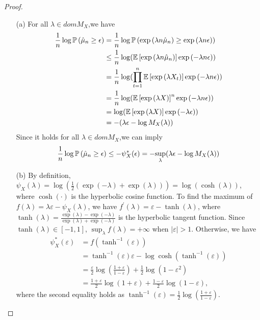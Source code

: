 \begin{proof}
\begin{enumerate}
	\item[(a)] For all $\lambda\in domM_X$,we have 
	    \begin{align*}
	        \frac{1}{n}\log\mathbb{P} \left(\hat{\mu}_n\geq\epsilon\right)&=\frac{1}{n}\log\mathbb{P} \left(\exp{(\lambda n\hat{\mu}_n)}\geq\exp{(\lambda n \epsilon)}\right)\\
	        &\leq \frac{1}{n}\log(\mathbb{E} \left[\exp{(\lambda n\hat{\mu}_n)}\right]\exp{(-\lambda n \epsilon)})\\
	        &=\frac{1}{n}\log(\prod_{t=1}^n\mathbb{E} \left[\exp{(\lambda X_t)}\right]\exp{(-\lambda n \epsilon)})\\
	        &=\frac{1}{n}\log(\mathbb{E} \left[\exp{(\lambda X)}\right]^n\exp{(-\lambda n \epsilon)})\\
	        &=\log(\mathbb{E} \left[\exp{(\lambda X)}\right]\exp{(-\lambda\epsilon)})\\
	        &=-(\lambda\epsilon-\log M_X(\lambda))
	    \end{align*}
        Since it holds for all $\lambda\in domM_X$,we can imply
        \begin{align*}
            \frac{1}{n}\log\mathbb{P} \left(\hat{\mu}_n\geq\epsilon\right)\leq -\psi_X^{\ast}(\epsilon)=-\underset{\lambda}{\sup}(\lambda\epsilon-\log M_X(\lambda))
        \end{align*}

	\item[(b)] By definition, $\psi_{X}(\lambda)=\log(\frac{1}{2}(\exp (-\lambda)+\exp (\lambda)))= \log(\cosh (\lambda))$, where $\cosh(\cdot)$ is the hyperbolic cosine function.
	To find the maximum of $f(\lambda) = \lambda \varepsilon - \psi_{X}(\lambda)$, we have $f^\prime(\lambda) = \varepsilon - \tanh(\lambda)$, where $\tanh(\lambda) = \frac{\exp(\lambda) - \exp(-\lambda)}{\exp(\lambda) + \exp(-\lambda)}$ is the hyperbolic tangent function.
	Since $\tanh(\lambda) \in[-1,1]$, $\sup _{\lambda} f(\lambda)=+\infty$ when $|\varepsilon|>1$.
	Otherwise, we have
	\begin{equation*}
		\begin{aligned}
			\psi_{X}^{*}(\varepsilon)
			&=f\left(\tanh ^{-1}(\varepsilon)\right)\\
			&=\tanh ^{-1}(\varepsilon) \varepsilon-\log \cosh \left(\tanh ^{-1}(\varepsilon)\right)\\
			&=\frac{\varepsilon}{2} \log \left(\frac{1+\varepsilon}{1-\varepsilon}\right)+\frac{1}{2} \log \left(1-\varepsilon^{2}\right)\\
			&=\frac{1+\varepsilon}{2} \log (1+\varepsilon)+\frac{1-\varepsilon}{2} \log (1-\varepsilon),
		\end{aligned}
	\end{equation*}
	where the second equality holds as $\tanh ^{-1}(\varepsilon)=\frac{1}{2} \log \left(\frac{1+\varepsilon}{1-\varepsilon}\right)$.


\end{enumerate}
\end{proof}
